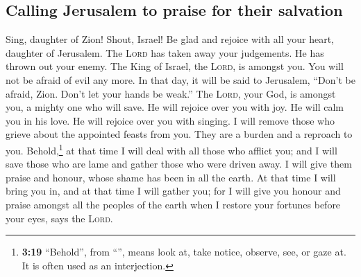 \hypertarget{calling-jerusalem-to-praise-for-their-salvation}{%
\subsection{Calling Jerusalem to praise for their
salvation}\label{calling-jerusalem-to-praise-for-their-salvation}}

 Sing, daughter of Zion! Shout, Israel! Be glad and
rejoice with all your heart, daughter of Jerusalem.  The
\textsc{Lord} has taken away your judgements. He has thrown out your
enemy. The King of Israel, the \textsc{Lord}, is amongst you. You will
not be afraid of evil any more.  In that day, it will be
said to Jerusalem, ``Don't be afraid, Zion. Don't let your hands be
weak.''  The \textsc{Lord}, your God, is amongst you, a
mighty one who will save. He will rejoice over you with joy. He will
calm you in his love. He will rejoice over you with singing.
 I will remove those who grieve about the appointed
feasts from you. They are a burden and a reproach to you.
 Behold,\footnote{\textbf{3:19} ``Behold'', from
  ``'', means look at, take notice, observe, see, or gaze
  at. It is often used as an interjection.} at that time I will deal
with all those who afflict you; and I will save those who are lame and
gather those who were driven away. I will give them praise and honour,
whose shame has been in all the earth.  At that time I
will bring you in, and at that time I will gather you; for I will give
you honour and praise amongst all the peoples of the earth when I
restore your fortunes before your eyes, says the \textsc{Lord}.
